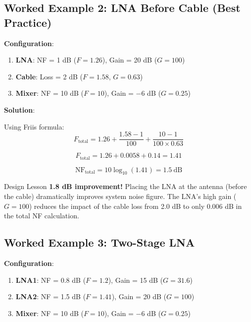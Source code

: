 \subsection{Worked Example 2: LNA Before Cable (Best Practice)}

\textbf{Configuration}:
\begin{enumerate}
\item \textbf{LNA}: NF = 1 dB ($F = 1.26$), Gain = 20 dB ($G = 100$)
\item \textbf{Cable}: Loss = 2 dB ($F = 1.58$, $G = 0.63$)
\item \textbf{Mixer}: NF = 10 dB ($F = 10$), Gain = $-6$ dB ($G = 0.25$)
\end{enumerate}

\textbf{Solution}:

Using Friis formula:
\begin{equation}
F_{\text{total}} = 1.26 + \frac{1.58 - 1}{100} + \frac{10 - 1}{100 \times 0.63}
\end{equation}

\begin{equation}
F_{\text{total}} = 1.26 + 0.0058 + 0.14 = 1.41
\end{equation}

\begin{equation}
\text{NF}_{\text{total}} = 10\log_{10}(1.41) = 1.5~\text{dB}
\end{equation}

\begin{calloutbox}{Design Lesson}
\textbf{1.8 dB improvement!} Placing the LNA at the antenna (before the cable) dramatically improves system noise figure. The LNA's high gain ($G = 100$) reduces the impact of the cable loss from 2.0 dB to only 0.006 dB in the total NF calculation.
\end{calloutbox}

\subsection{Worked Example 3: Two-Stage LNA}

\textbf{Configuration}:
\begin{enumerate}
\item \textbf{LNA1}: NF = 0.8 dB ($F = 1.2$), Gain = 15 dB ($G = 31.6$)
\item \textbf{LNA2}: NF = 1.5 dB ($F = 1.41$), Gain = 20 dB ($G = 100$)
\item \textbf{Mixer}: NF = 10 dB ($F = 10$), Gain = $-6$ dB ($G = 0.25$)
\end{enumerate}

